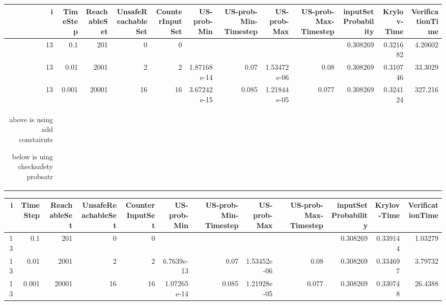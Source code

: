 \begin{tabular}{rrrrrrrrrrrr}
\hline
   i &   TimeStep &   ReachableSet &   UnsafeReachableSet &   CounterInputSet &   US-prob-Min &   US-prob-Min-Timestep &   US-prob-Max &   US-prob-Max-Timestep &   inputSet Probability &   Krylov-Time &   VerificationTime \\
\hline
  13 &      0.1   &            201 &                    0 &                 0 &               &                        &               &                        &               0.308269 &      0.321682 &            4.20602 \\
  13 &      0.01  &           2001 &                    2 &                 2 &   1.87168e-14 &                  0.07  &   1.53472e-06 &                  0.08  &               0.308269 &      0.310746 &           33.3029  \\
  13 &      0.001 &          20001 &                   16 &                16 &   3.67242e-15 &                  0.085 &   1.21844e-05 &                  0.077 &               0.308269 &      0.324124 &          327.216   \\
\hline
above is using add constairnts


below is uing checksafety probsatr
\end{tabular}
\begin{tabular}{rrrrrrrrrrrr}
\hline
   i &   TimeStep &   ReachableSet &   UnsafeReachableSet &   CounterInputSet &   US-prob-Min &   US-prob-Min-Timestep &   US-prob-Max &   US-prob-Max-Timestep &   inputSet Probability &   Krylov-Time &   VerificationTime \\
\hline
  13 &      0.1   &            201 &                    0 &                 0 &               &                        &               &                        &               0.308269 &      0.339144 &            1.03279 \\
  13 &      0.01  &           2001 &                    2 &                 2 &   6.7639e-13  &                  0.07  &   1.53452e-06 &                  0.08  &               0.308269 &      0.334697 &            3.79732 \\
  13 &      0.001 &          20001 &                   16 &                16 &   1.07265e-14 &                  0.085 &   1.21928e-05 &                  0.077 &               0.308269 &      0.330748 &           26.4388  \\
\hline
\end{tabular}
